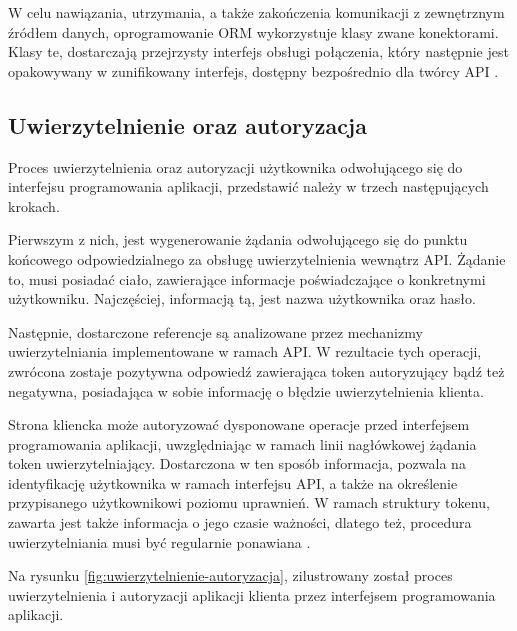 W celu nawiązania, utrzymania, a także zakończenia komunikacji z zewnętrznym źródłem danych, oprogramowanie ORM wykorzystuje klasy zwane konektorami. Klasy te, dostarczają przejrzysty interfejs obsługi połączenia, który następnie jest opakowywany w zunifikowany interfejs, dostępny bezpośrednio dla twórcy API \cite{TORRES20171}.

\subsection*{Uwierzytelnienie oraz autoryzacja}
Proces uwierzytelnienia oraz autoryzacji użytkownika odwołującego się do interfejsu programowania aplikacji, przedstawić należy w trzech następujących krokach.

Pierwszym z nich, jest wygenerowanie żądania odwołującego się do punktu końcowego odpowiedzialnego za obsługę uwierzytelnienia wewnątrz API. Żądanie to, musi posiadać ciało, zawierające informacje poświadczające o konkretnymi użytkowniku. Najczęściej, informacją tą, jest nazwa użytkownika oraz hasło.

Następnie, dostarczone referencje są analizowane przez mechanizmy uwierzytelniania implementowane w ramach API. W rezultacie tych operacji, zwrócona zostaje pozytywna odpowiedź zawierająca token autoryzujący bądź też negatywna, posiadająca w sobie informację o błędzie uwierzytelnienia klienta.

Strona kliencka może autoryzować dysponowane operacje przed interfejsem programowania aplikacji, uwzględniając w ramach linii nagłówkowej żądania token uwierzytelniający. Dostarczona w ten sposób informacja, pozwala na identyfikację użytkownika w ramach interfejsu API, a także na określenie przypisanego użytkownikowi poziomu uprawnień. W ramach struktury tokenu, zawarta jest także informacja o jego czasie ważności, dlatego też, procedura uwierzytelniania musi być regularnie ponawiana \cite{lakshmiraghavan2013pro}.

Na rysunku \ref{fig:uwierzytelnienie-autoryzacja}, zilustrowany został proces uwierzytelnienia i autoryzacji aplikacji klienta przez interfejsem programowania aplikacji. 

